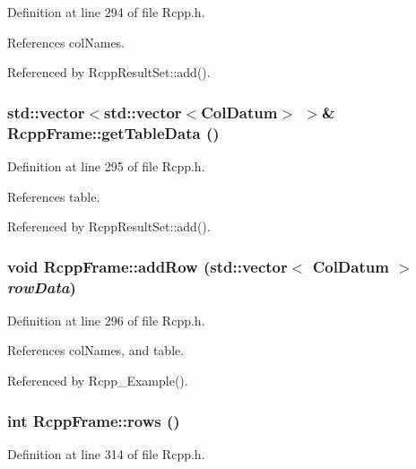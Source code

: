 Definition at line 294 of file Rcpp.h.

References colNames.

Referenced by RcppResultSet::add().\hypertarget{classRcppFrame_3a0ac7b2822fc590f6f93ee775b134d0}{
\subsubsection[getTableData]{\setlength{\rightskip}{0pt plus 5cm}std::vector$<$std::vector$<${\bf ColDatum}$>$ $>$\& RcppFrame::getTableData ()}}
\label{classRcppFrame_3a0ac7b2822fc590f6f93ee775b134d0}




Definition at line 295 of file Rcpp.h.

References table.

Referenced by RcppResultSet::add().\hypertarget{classRcppFrame_ae72791527f2947a477633151106f42c}{
\subsubsection[addRow]{\setlength{\rightskip}{0pt plus 5cm}void RcppFrame::addRow (std::vector$<$ {\bf ColDatum} $>$ {\em rowData})}}
\label{classRcppFrame_ae72791527f2947a477633151106f42c}




Definition at line 296 of file Rcpp.h.

References colNames, and table.

Referenced by Rcpp\_\-Example().\hypertarget{classRcppFrame_a33ab9553bb9fa510c338a3e092d9ace}{
\subsubsection[rows]{\setlength{\rightskip}{0pt plus 5cm}int RcppFrame::rows ()}}
\label{classRcppFrame_a33ab9553bb9fa510c338a3e092d9ace}




Definition at line 314 of file Rcpp.h.

